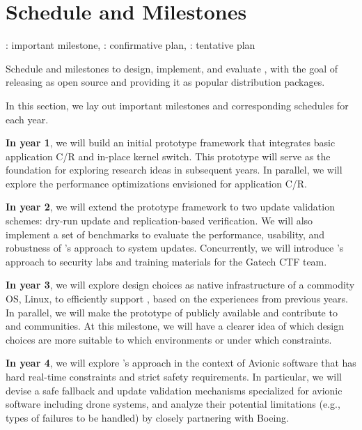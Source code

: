 \section{Schedule and Milestones}
\label{s:plan}

\begin{table}[t!]
\centering
\resizebox{1.0\columnwidth}{!}{
 
}
\quad\checkmark: important milestone,
\quad\colorbox{gray}{\phantom{XX}} : confirmative plan, 
\quad\colorbox{lightgray}{\phantom{XX}} : tentative plan
\caption{Schedule and milestones to design, implement, and evaluate
  \sys, with the goal of releasing \sys as open source and providing
  it as popular distribution packages.}
\label{t:plan}
\end{table}
\fi

In this section, we lay out important
milestones and corresponding schedules for each year.

\textbf{In year 1}, we will build an initial prototype framework
that integrates basic application C/R and in-place kernel switch.
%
This prototype will serve as the foundation
for exploring research ideas in subsequent years.
%
In parallel, we will explore the performance
optimizations envisioned for application C/R\@.

\textbf{In year 2}, we will extend the prototype framework
to two update validation schemes:
dry-run update and replication-based verification.
%
We will also implement a set of benchmarks to evaluate the
performance, usability, and robustness of \sys's approach
to system updates.
%
Concurrently, we will introduce \sys's approach to
security labs and training materials for the Gatech CTF team.

\textbf{In year 3}, we will explore design choices
as native infrastructure of a commodity OS,
Linux, to efficiently support \sys,
based on the experiences from previous years.
%
In parallel, we will make the prototype of \sys publicly available and
contribute to \criu and  communities.
%
At this milestone, we will have a clearer idea of which design choices
are more suitable to which environments or under which constraints.

\textbf{In year 4}, we will explore \sys's approach 
in the context of Avionic software 
that has hard real-time constraints and
strict safety requirements.
%
In particular,
we will devise a safe fallback and update validation mechanisms
specialized for avionic software including drone systems,
and analyze their potential limitations
(e.g., types of failures to be handled)
by closely partnering with Boeing.

